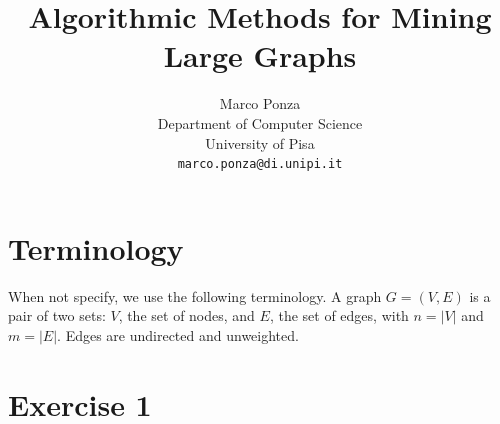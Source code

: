 \documentclass[12pt,a4paper]{article}
\begin{document}
\title{\textbf{Algorithmic Methods for Mining Large Graphs}}
\author{Marco Ponza\\Department of Computer Science\\University of Pisa\\\texttt{marco.ponza@di.unipi.it}}
\maketitle

\section*{Terminology}
When not specify, we use the following terminology. A graph $G = (V, E)$ is a pair of two sets: $V$, the set of nodes, and $E$, the set of edges, with $n = |V|$ and $m = |E|$. Edges are undirected and unweighted.


\section*{Exercise 1}
\end{document}
